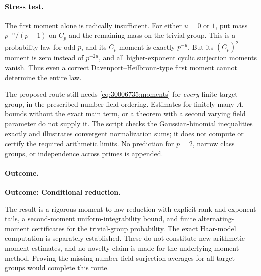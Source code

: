 \documentclass[11pt,a4paper]{article}
\numberwithin{equation}{section}
\begin{document}
\paragraph{Stress test.}
The first moment alone is radically insufficient. For either $u=0$ or $1$,
put mass $p^{-u}/(p-1)$ on $C_p$ and the remaining mass on the trivial
group. This is a probability law for odd $p$, and its $C_p$ moment is
exactly $p^{-u}$. But its $(C_p)^2$ moment is zero instead of $p^{-2u}$,
and all higher-exponent cyclic surjection moments vanish. Thus even a
correct Davenport--Heilbronn-type first moment cannot determine the
entire law.

The proposed route still needs \eqref{eq:30006735:moments} for \emph{every}
finite target group, in the prescribed number-field ordering. Estimates
for finitely many $A$, bounds without the exact main term, or a theorem
with a second varying field parameter do not supply it. The script checks
the Gaussian-binomial inequalities exactly and illustrates convergent
normalization sums; it does not compute or certify the required arithmetic
limits. No prediction for $p=2$, narrow class groups, or independence
across primes is appended.

\paragraph{Outcome.}
\textbf{Outcome: Conditional reduction.}

The result is a rigorous moment-to-law reduction with explicit rank and
exponent tails, a second-moment uniform-integrability bound, and finite
alternating-moment certificates for the trivial-group probability.
The exact Haar-model computation is separately established. These do not
constitute new arithmetic moment estimates, and no novelty claim is made
for the underlying moment method. Proving the missing number-field
surjection averages for all target groups would complete this route.
\end{document}
